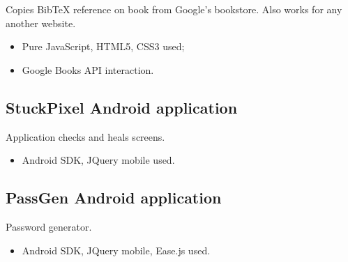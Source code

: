 \documentclass[11pt,a4paper,sans]{moderncv}        %
\begin{document}
Copies BibTeX reference on book from Google's bookstore. Also works for any another website.

\begin{itemize}%
	\item Pure JavaScript, HTML5, CSS3 used;
	\item Google Books API interaction.
\end{itemize}

\subsection{StuckPixel Android application~\href{https://play.google.com/store/apps/details?id=com.livich.stuckpixel}{\homepagesymbol}}

Application checks and heals screens.

\begin{itemize}%
	\item Android SDK, JQuery mobile used.
\end{itemize}

\subsection{PassGen Android application~\href{https://play.google.com/store/apps/details?id=com.livich.passgen}{\homepagesymbol}}

Password generator.

\begin{itemize}%
	\item Android SDK, JQuery mobile, Ease.js used.
\end{itemize}

\iffalse
	\subsection{Course Work of 5\textsuperscript{th} semester in NTU "KhPI"~\href{https://github.com/Livich/cw31}{\githubsocialsymbol}}
	\begin{itemize}%
	\item PostgreSQL DBMS used. Dzhabrailova's multi-criteria ranking was implemented on the DBMS side using PL/Python;
	\item Previously developed PHP5 micro-framework used.
	\end{itemize}
\fi
\end{document}
